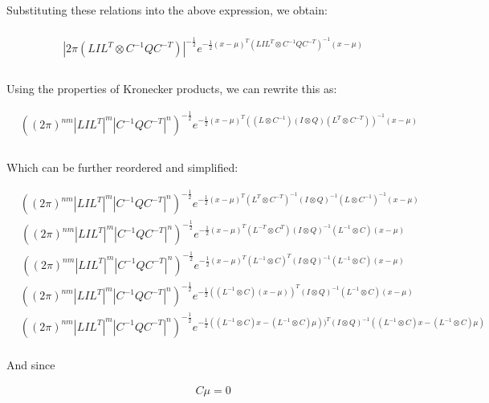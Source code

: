 \documentclass[10pt]{article}
\begin{document}
Substituting these relations into the above expression, we obtain:

\begin{align*}
\\
&|2\pi(LIL^T \otimes C^{-1}QC^{-T})|^{-\frac{1}{2}}e^{-\frac{1}{2}(x-\mu)^T(LIL^T \otimes C^{-1}QC^{-T})^{-1}(x-\mu)}\\
\\
\end{align*}

Using the properties of Kronecker products, we can rewrite this as:

\begin{align*}
&((2\pi)^{nm}|LIL^T|^m |C^{-1}QC^{-T}|^n)^{-\frac{1}{2}}e^{-\frac{1}{2}(x-\mu)^T((L \otimes C^{-1})(I \otimes Q)(L^T \otimes C^{-T}))^{-1}(x-\mu)}\\
\\
\end{align*}

Which can be further reordered and simplified:

\begin{align*}
&((2\pi)^{nm}|LIL^T|^m |C^{-1}QC^{-T}|^n)^{-\frac{1}{2}}e^{-\frac{1}{2}(x-\mu)^T(L^T \otimes C^{-T})^{-1}(I \otimes Q)^{-1}(L \otimes C^{-1})^{-1}(x-\mu)}
\end{align*}
\begin{align*}
&((2\pi)^{nm}|LIL^T|^m |C^{-1}QC^{-T}|^n)^{-\frac{1}{2}}e^{-\frac{1}{2}(x-\mu)^T(L^{-T} \otimes C^{T})(I \otimes Q)^{-1}(L^{-1} \otimes C)(x-\mu)}
\end{align*}
\begin{align*}
&((2\pi)^{nm}|LIL^T|^m |C^{-1}QC^{-T}|^n)^{-\frac{1}{2}}e^{-\frac{1}{2}(x-\mu)^T(L^{-1} \otimes C)^{T}(I \otimes Q)^{-1}(L^{-1} \otimes C)(x-\mu)}
\end{align*}
\begin{align*}
&((2\pi)^{nm}|LIL^T|^m |C^{-1}QC^{-T}|^n)^{-\frac{1}{2}}e^{-\frac{1}{2}((L^{-1} \otimes C)(x-\mu))^{T}(I \otimes Q)^{-1}(L^{-1} \otimes C)(x-\mu)}
\end{align*}
\begin{align*}
&((2\pi)^{nm}|LIL^T|^m |C^{-1}QC^{-T}|^n)^{-\frac{1}{2}}e^{-\frac{1}{2}((L^{-1} \otimes C)x-(L^{-1} \otimes C)\mu))^{T}(I \otimes Q)^{-1}((L^{-1} \otimes C)x-(L^{-1} \otimes C)\mu)}\\
\end{align*}

And since

\begin{align*}
&C\mu = 0
\end{align*}
\end{document}
